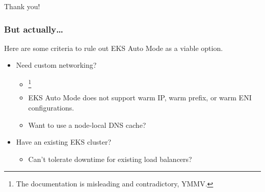 \documentclass[english]{beamer}
\begin{document}
\begin{frame}[plain]
  \begin{center}
    \Huge Thank you!  \\
  \end{center}
\end{frame}

\begin{frame}
  \frametitle{But actually\ldots}

  Here are some criteria to rule out EKS Auto Mode as a viable option.

  \begin{itemize}
    \item Need custom networking?
          \begin{itemize}
            \pause
            \item {}
                  \footnote<2->{The documentation is misleading and
                    contradictory, YMMV.}
                  \pause
            \item {} EKS Auto Mode does not support
                  warm IP, warm prefix, or warm ENI configurations.
                  \pause
            \item {} Want to use a node-local DNS cache?
          \end{itemize}
          \pause
    \item Have an existing EKS cluster?
          \begin{itemize}
            \pause
            \item {} Can't tolerate downtime for
                  existing load balancers?
          \end{itemize}
  \end{itemize}
\end{frame}
\end{document}
